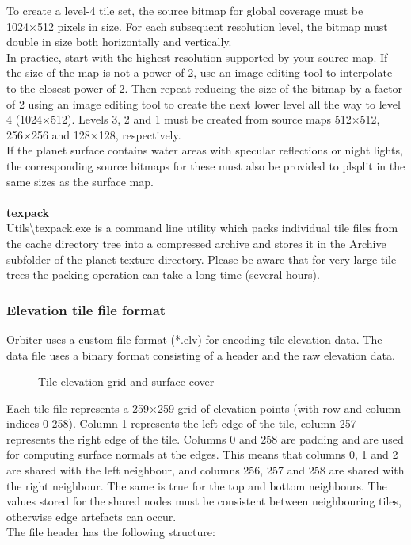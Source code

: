 \documentclass[Orbiter Developer Manual.tex]{subfiles}
\begin{document}
To create a level-4 tile set, the source bitmap for global coverage must be 1024×512 pixels in size. For each subsequent resolution level, the bitmap must double in size both horizontally and vertically.\\
In practice, start with the highest resolution supported by your source map. If the size of the map is not a power of 2, use an image editing tool to interpolate to the closest power of 2. Then repeat reducing the size of the bitmap by a factor of 2 using an image editing tool to create the next lower level all the way to level 4 (1024×512). Levels 3, 2 and 1 must be created from source maps 512×512, 256×256 and 128×128, respectively.\\
If the planet surface contains water areas with specular reflections or night lights, the corresponding source bitmaps for these must also be provided to plsplit in the same sizes as the surface map.\\
\\
\textbf{texpack}\\
Utils\textbackslash texpack.exe is a command line utility which packs individual tile files from the cache directory tree into a compressed archive and stores it in the Archive subfolder of the planet texture directory. Please be aware that for very large tile trees the packing operation can take a long time (several hours).


\subsubsection{Elevation tile file format}
Orbiter uses a custom file format (*.elv) for encoding tile elevation data. The data file uses a binary format consisting of a header and the raw elevation data.

\begin{figure}[H]
	\centering
	\caption{Tile elevation grid and surface cover}
\end{figure}

\noindent
Each tile file represents a 259×259 grid of elevation points (with row and column indices 0-258). Column 1 represents the left edge of the tile, column 257 represents the right edge of the tile. Columns 0 and 258 are padding and are used for computing surface normals at the edges. This means that columns 0, 1 and 2 are shared with the left neighbour, and columns 256, 257 and 258 are shared with the right neighbour. The same is true for the top and bottom neighbours. The values stored for the shared nodes must be consistent between neighbouring tiles, otherwise edge artefacts can occur.\\
The file header has the following structure:
\end{document}
